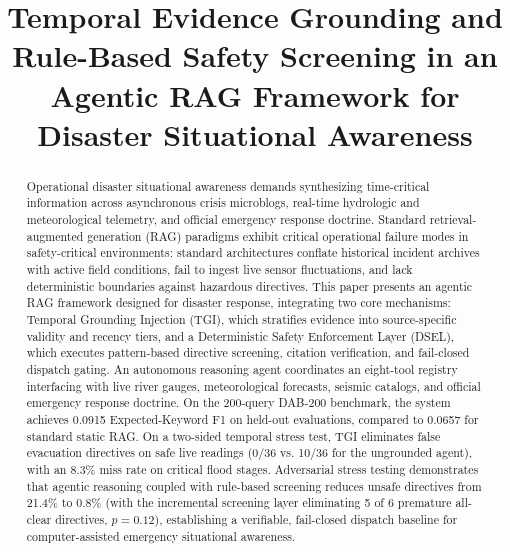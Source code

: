 \documentclass[conference]{IEEEtran}
\begin{document}
\title{Temporal Evidence Grounding and Rule-Based Safety Screening in an Agentic RAG Framework for Disaster Situational Awareness}

\author{
}

\maketitle

\begin{abstract}
Operational disaster situational awareness demands synthesizing time-critical information across asynchronous crisis microblogs, real-time hydrologic and meteorological telemetry, and official emergency response doctrine. Standard retrieval-augmented generation (RAG) paradigms exhibit critical operational failure modes in safety-critical environments: standard architectures conflate historical incident archives with active field conditions, fail to ingest live sensor fluctuations, and lack deterministic boundaries against hazardous directives. This paper presents an agentic RAG framework designed for disaster response, integrating two core mechanisms: Temporal Grounding Injection (TGI), which stratifies evidence into source-specific validity and recency tiers, and a Deterministic Safety Enforcement Layer (DSEL), which executes pattern-based directive screening, citation verification, and fail-closed dispatch gating. An autonomous reasoning agent coordinates an eight-tool registry interfacing with live river gauges, meteorological forecasts, seismic catalogs, and official emergency response doctrine. On the 200-query DAB-200 benchmark, the system achieves 0.0915 Expected-Keyword F1 on held-out evaluations, compared to 0.0657 for standard static RAG. On a two-sided temporal stress test, TGI eliminates false evacuation directives on safe live readings (0/36 vs. 10/36 for the ungrounded agent), with an 8.3\% miss rate on critical flood stages. Adversarial stress testing demonstrates that agentic reasoning coupled with rule-based screening reduces unsafe directives from 21.4\% to 0.8\% (with the incremental screening layer eliminating 5 of 6 premature all-clear directives, $p=0.12$), establishing a verifiable, fail-closed dispatch baseline for computer-assisted emergency situational awareness.
\end{abstract}
\end{document}
